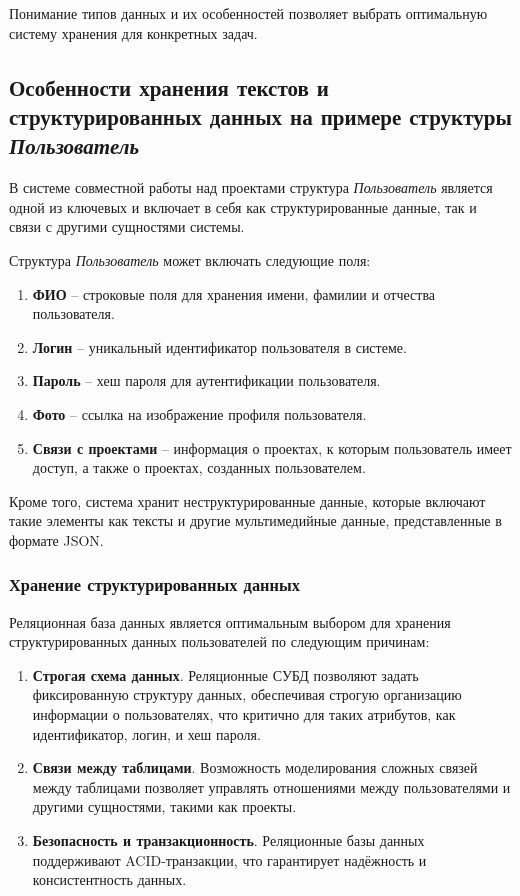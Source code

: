 Понимание типов данных и их особенностей позволяет выбрать оптимальную систему хранения для конкретных задач.

\subsection{Особенности хранения текстов и структурированных данных на примере структуры \textit{Пользователь}}

В системе совместной работы над проектами структура \textit{Пользователь} является одной из ключевых и включает в себя как структурированные данные, так и связи с другими сущностями системы.

Структура \textit{Пользователь} может включать следующие поля:

\begin{enumerate}[wide=12.5mm, leftmargin=12.5mm]
    \item \textbf{ФИО} -- строковые поля для хранения имени, фамилии и отчества пользователя.
    \item \textbf{Логин} -- уникальный идентификатор пользователя в системе.
    \item \textbf{Пароль} -- хеш пароля для аутентификации пользователя.
    \item \textbf{Фото} -- ссылка на изображение профиля пользователя.
    \item \textbf{Связи с проектами} -- информация о проектах, к которым пользователь имеет доступ, а также о проектах, созданных пользователем.
\end{enumerate}

Кроме того, система хранит неструктурированные данные, которые включают такие элементы как тексты и другие мультимедийные данные, представленные в формате JSON.

\clearpage
\subsubsection{Хранение структурированных данных}

Реляционная база данных является оптимальным выбором для хранения структурированных данных пользователей по следующим причинам:

\begin{enumerate}[wide=12.5mm, leftmargin=12.5mm]
    \item \textbf{Строгая схема данных}. Реляционные СУБД позволяют задать фиксированную структуру данных, обеспечивая строгую организацию информации о пользователях, что критично для таких атрибутов, как идентификатор, логин, и хеш пароля.
    \item \textbf{Связи между таблицами}. Возможность моделирования сложных связей между таблицами позволяет управлять отношениями между пользователями и другими сущностями, такими как проекты.
    \item \textbf{Безопасность и транзакционность}. Реляционные базы данных поддерживают ACID-транзакции, что гарантирует надёжность и консистентность данных.
\end{enumerate}

